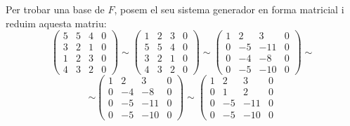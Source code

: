\documentclass[a4paper, 12pt]{article}
\begin{document}
    \begin{solucio}
        Per trobar una base de $F$, posem el seu sistema generador en forma matricial i reduim aquesta
        matriu: 
        \begin{displaymath}
            \left(
                \begin{array}{cccc}
                    5 & 5 & 4 & 0\\
                    3 & 2 & 1 & 0\\
                    1 & 2 & 3 & 0\\
                    4 & 3 & 2 & 0
                \end{array}
            \right)
            \sim
            \left(
                \begin{array}{cccc}
                    1 & 2 & 3 & 0\\
                    5 & 5 & 4 & 0\\
                    3 & 2 & 1 & 0\\
                    4 & 3 & 2 & 0
                \end{array}
            \right)
            \sim
            \left(
                \begin{array}{cccc}
                    1 & 2 & 3 & 0\\
                    0 & -5 & -11 & 0\\
                    0 & -4 & -8 & 0\\
                    0 & -5 & -10 & 0
                \end{array}
            \right)
            \sim
        \end{displaymath}
        \begin{displaymath}
            \sim
            \left(
                \begin{array}{cccc}
                    1 & 2 & 3 & 0\\
                    0 & -4 & -8 & 0\\
                    0 & -5 & -11 & 0\\
                    0 & -5 & -10 & 0
                \end{array}
            \right)
            \sim
            \left(
                \begin{array}{cccc}
                    1 & 2 & 3 & 0\\
                    0 & 1 & 2 & 0\\
                    0 & -5 & -11 & 0\\
                    0 & -5 & -10 & 0

\end{array}
\end{displaymath}
\end{solucio}
\end{document}
